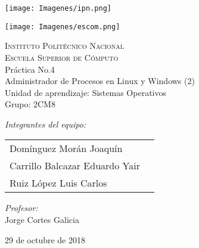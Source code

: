 \documentclass[12pt]{article}
\begin{document}
		\begin{titlepage}
			\begin{center}
				\noindent
				\begin{minipage}{0.5\textwidth}
					\begin{flushleft} \large
					\texttt{[image: Imagenes/ipn.png]}
					\end{flushleft}
				\end{minipage}%
				\begin{minipage}{0.55\textwidth}
					\begin{flushright} \large
			       	\texttt{[image: Imagenes/escom.png]}
					\end{flushright}
				\end{minipage}
				\textsc{\LARGE Instituto Politécnico Nacional}\\[0.5cm]
				\textsc{\Large Escuela Superior de Cómputo}\\[1cm]
				{ \huge Práctica No.4 \\[1cm] }
				{\huge Administrador de Procesos en Linux y Windows (2)\\[1cm]}
				{ \Large Unidad de aprendizaje: Sistemas Operativos} \\[1cm]
				{ \Large Grupo: 2CM8 } \\[1cm]
				\noindent
				\begin{minipage}{0.5\textwidth}
					\begin{flushleft} \large
						\emph{Integrantes del equipo:}\\
						\begin{tabular}{ll}
					     Domínguez Morán Joaquín\\
					     Carrillo Balcazar Eduardo Yair\\
					     Ruiz López Luis Carlos\\
					\end{tabular}
					\end{flushleft}
				\end{minipage}%
				\begin{minipage}{0.5\textwidth}
					\begin{flushright} \large
						\emph{Profesor:} \\
						Jorge Cortes Galicia 
					\end{flushright}
				\end{minipage}
				
				\vfill
				{\large 29 de octubre de 2018}
			\end{center}
		\end{titlepage}
		
\end{document}
